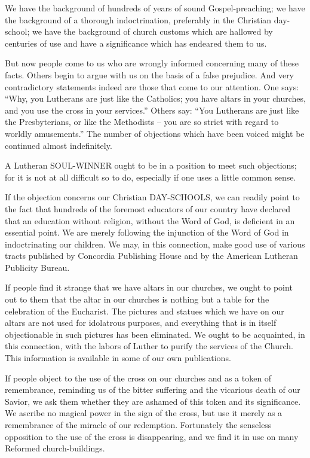 \documentclass[
]{book}
\begin{document}
We have the background of hundreds of years of sound Gospel-preaching; we have the background of a thorough indoctrination, preferably in the Christian day-school; we have the background of church customs which are hallowed by centuries of use and have a significance which has endeared them to us.

But now people come to us who are wrongly informed concerning many of these facts. Others begin to argue with us on the basis of a false prejudice. And very contradictory statements indeed are those that come to our attention. One says: ``Why, you Lutherans are just like the Catholics; you have altars in your churches, and you use the cross in your services.'' Others say: ``You Lutherans are just like the Presbyterians, or like the Methodists -- you are so strict with regard to worldly amusements.'' The number of objections which have been voiced might be continued almost indefinitely.

A Lutheran SOUL-WINNER ought to be in a position to meet such objections; for it is not at all difficult so to do, especially if one uses a little common sense.

If the objection concerns our Christian DAY-SCHOOLS, we can readily point to the fact that hundreds of the foremost educators of our country have declared that an education without religion, without the Word of God, is deficient in an essential point. We are merely following the injunction of the Word of God in indoctrinating our children. We may, in this connection, make good use of various tracts published by Concordia Publishing House and by the American Lutheran Publicity Bureau.

If people find it strange that we have altars in our churches, we ought to point out to them that the altar in our churches is nothing but a table for the celebration of the Eucharist. The pictures and statues which we have on our altars are not used for idolatrous purposes, and everything that is in itself objectionable in such pictures has been eliminated. We ought to be acquainted, in this connection, with the labors of Luther to purify the services of the Church. This information is available in some of our own publications.

If people object to the use of the cross on our churches and as a token of remembrance, reminding us of the bitter suffering and the vicarious death of our Savior, we ask them whether they are ashamed of this token and its significance. We ascribe no magical power in the sign of the cross, but use it merely as a remembrance of the miracle of our redemption. Fortunately the senseless opposition to the use of the cross is disappearing, and we find it in use on many Reformed church-buildings.
\end{document}
